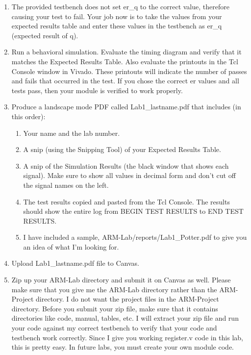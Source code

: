 \begin{enumerate}
\item The provided testbench does not set er\_q to the correct value, therefore causing your test to fail.  Your job now is to take the values from your expected results table and enter these values in the testbench as er\_q (expected result of q).
\item Run a behavioral simulation.  Evaluate the timing diagram and verify that it matches the Expected Results Table.  Also evaluate the printouts in the Tcl Console window in Vivado.  These printouts will indicate the number of passes and fails that occurred in the test.  If you chose the correct er values and all tests pass, then your module is verified to work properly.   
\item Produce a landscape mode PDF called Lab1\_lastname.pdf that includes (in this order):
	\begin{enumerate}
		\item Your name and the lab number.
		\item A snip (using the Snipping Tool) of your Expected Results Table.
		\item A snip of the Simulation Results (the black window that shows each signal).  Make sure to show all values in decimal form and don't cut off the signal names on the left.  
		\item The test results copied and pasted from the Tcl Console.  The results should show the entire log from BEGIN TEST RESULTS to END TEST RESULTS.
		\item I have included a sample, ARM-Lab/reports/Lab1\_Potter.pdf to give you an idea of what I'm looking for. 
	\end{enumerate}
\item Upload Lab1\_lastname.pdf file to Canvas.
\item Zip up your ARM-Lab directory and submit it on Canvas as well.  Please make sure that you give me the ARM-Lab directory rather than the ARM-Project directory.  I do not want the project files in the ARM-Project directory.  Before you submit your zip file, make sure that it contains directories like code, manual, tables, etc.  I will extract your zip file and run your code against my correct testbench to verify that your code and testbench work correctly.  Since I give you working register.v code in this lab, this is pretty easy.  In future labs, you must create your own module code.
\end{enumerate} 
